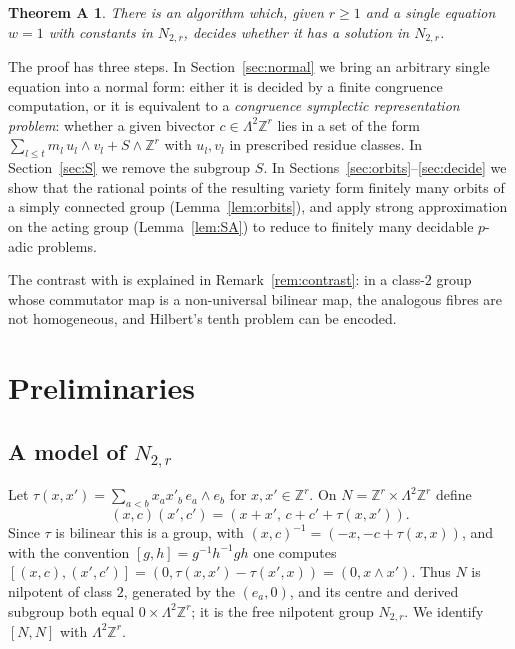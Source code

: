 \documentclass[11pt]{amsart}
\newtheorem*{theoremA}{Theorem A}
\theoremstyle{definition}
\theoremstyle{remark}
\newcommand{\Z}{\mathbb{Z}}
\newcommand{\w}{\wedge}
\begin{document}
\begin{theoremA}
There is an algorithm which, given $r\ge1$ and a single equation $w=1$ with
constants in $N_{2,r}$, decides whether it has a solution in $N_{2,r}$.
\end{theoremA}

The proof has three steps. In Section~\ref{sec:normal} we bring an arbitrary single
equation into a normal form: either it is decided by a finite congruence
computation, or it is equivalent to a \emph{congruence symplectic representation
problem}: whether a given bivector $c\in\Lambda^2\Z^r$ lies in a set of the form
$\sum_{l\le t}m_l\,u_l\w v_l+S\w\Z^r$ with $u_l,v_l$ in prescribed residue classes.
In Section~\ref{sec:S} we remove the subgroup $S$. In
Sections~\ref{sec:orbits}--\ref{sec:decide} we show that the rational points of
the resulting variety form finitely many orbits of a simply connected group
(Lemma~\ref{lem:orbits}), and apply strong approximation on the acting group
(Lemma~\ref{lem:SA}) to reduce to finitely many decidable $p$-adic problems.

The contrast with \cite{Rom16a} is explained in Remark~\ref{rem:contrast}: in a
class-$2$ group whose commutator map is a non-universal bilinear map, the analogous
fibres are not homogeneous, and Hilbert's tenth problem can be encoded.

\section{Preliminaries}\label{sec:prelim}

\subsection{A model of \texorpdfstring{$N_{2,r}$}{N(2,r)}}
Let $\tau(x,x')=\sum_{a<b}x_ax'_b\,e_a\w e_b$ for $x,x'\in\Z^r$. On
$N=\Z^r\times\Lambda^2\Z^r$ define
\[(x,c)(x',c')=(x+x',\,c+c'+\tau(x,x')).\]
Since $\tau$ is bilinear this is a group, with $(x,c)^{-1}=(-x,-c+\tau(x,x))$, and
with the convention $[g,h]=g^{-1}h^{-1}gh$ one computes
$[(x,c),(x',c')]=(0,\tau(x,x')-\tau(x',x))=(0,x\w x')$. Thus $N$ is nilpotent of
class $2$, generated by the $(e_a,0)$, and its centre and derived subgroup both
equal $0\times\Lambda^2\Z^r$; it is the free nilpotent group $N_{2,r}$. We identify
$[N,N]$ with $\Lambda^2\Z^r$.
\end{document}
